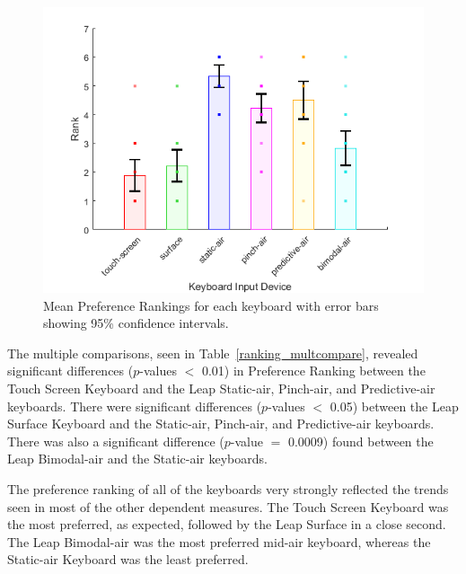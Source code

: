 \begin{figure}[!t]
	\centering
	\includegraphics{Figures/fig_ranking_mean}
	\caption[Mean Preference Rankings]{Mean Preference Rankings for each keyboard with error bars showing 95\% confidence intervals.}
	\label{fig_ranking_mean}
\end{figure}

The multiple comparisons, seen in Table~\ref{ranking_multcompare}, revealed significant differences ($p$-values $<$ 0.01) in Preference Ranking between the Touch Screen Keyboard and the Leap Static-air, Pinch-air, and Predictive-air keyboards. There were significant differences ($p$-values $<$ 0.05) between the Leap Surface Keyboard and the Static-air, Pinch-air, and Predictive-air keyboards. There was also a significant difference ($p$-value $=$ 0.0009) found between the Leap Bimodal-air and the Static-air keyboards.

The preference ranking of all of the keyboards very strongly reflected the trends seen in most of the other dependent measures. The Touch Screen Keyboard was the most preferred, as expected, followed by the Leap Surface in a close second. The Leap Bimodal-air was the most preferred mid-air keyboard, whereas the Static-air Keyboard was the least preferred.